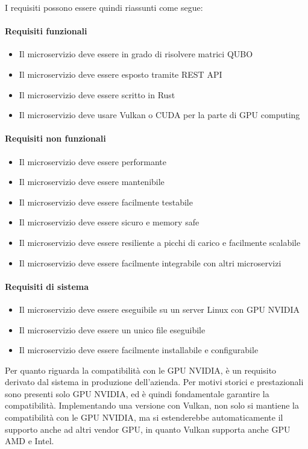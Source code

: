 I requisiti possono essere quindi riassunti come segue:

\paragraph{Requisiti funzionali}
\begin{itemize}
    \item Il microservizio deve essere in grado di risolvere matrici QUBO
    \item Il microservizio deve essere esposto tramite REST API
    \item Il microservizio deve essere scritto in Rust
    \item Il microservizio deve usare Vulkan o CUDA per la parte di GPU computing
\end{itemize}

\paragraph{Requisiti non funzionali}
\begin{itemize}
    \item Il microservizio deve essere performante
    \item Il microservizio deve essere mantenibile
    \item Il microservizio deve essere facilmente testabile
    \item Il microservizio deve essere sicuro e memory safe
    \item Il microservizio deve essere resiliente a picchi di carico e facilmente scalabile
    \item Il microservizio deve essere facilmente integrabile con altri microservizi
\end{itemize}

\paragraph{Requisiti di sistema}
\begin{itemize}
    \item Il microservizio deve essere eseguibile su un server Linux con GPU NVIDIA
    \item Il microservizio deve essere un unico file eseguibile
    \item Il microservizio deve essere facilmente installabile e configurabile
\end{itemize}

Per quanto riguarda la compatibilità con le GPU NVIDIA, è un requisito derivato dal sistema in produzione dell'azienda. Per motivi storici e prestazionali sono presenti solo GPU NVIDIA, ed è quindi fondamentale garantire la compatibilità. Implementando una versione con Vulkan, non solo si mantiene la compatibilità con le GPU NVIDIA, ma si estenderebbe automaticamente il supporto anche ad altri vendor GPU, in quanto Vulkan supporta anche GPU AMD e Intel.

